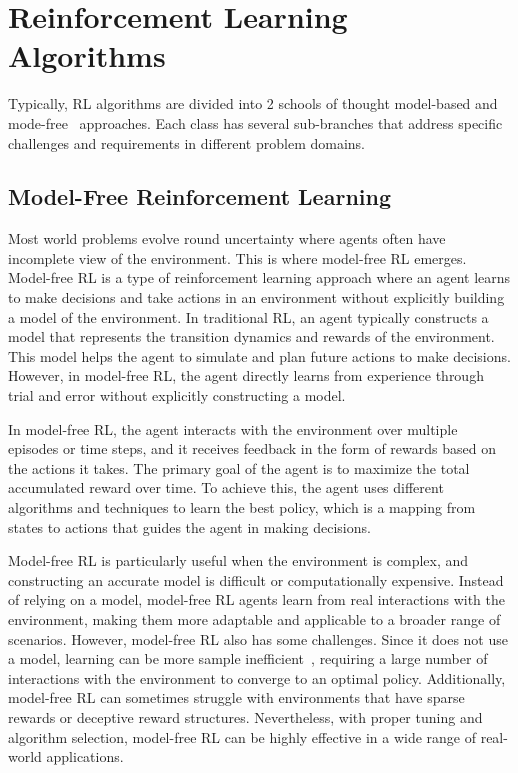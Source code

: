 \section{Reinforcement Learning Algorithms}\label{sec:reinforcement-learning-algorithms}

Typically, RL algorithms are divided into 2
schools of thought \textemdash model-based and mode-free~\cite{sutton2018reinforcement} approaches.
Each class has several sub-branches that address specific challenges and requirements in different problem domains.

\subsection{Model-Free Reinforcement Learning}\label{subsec:model-free-reinforcement-learning}
Most world problems evolve round uncertainty where agents often have incomplete view of the environment.
This is where model-free RL emerges.
Model-free RL is a type of reinforcement learning approach where an agent learns to make decisions and take actions in an environment without explicitly building a model of the environment. In traditional RL, an agent typically constructs a model that represents the transition dynamics and rewards of the environment. This model helps the agent to simulate and plan future actions to make decisions. However, in model-free RL, the agent directly learns from experience through trial and error without explicitly constructing a model.

In model-free RL, the agent interacts with the environment over multiple episodes or time steps, and it receives feedback in the form of rewards based on the actions it takes. The primary goal of the agent is to maximize the total accumulated reward over time. To achieve this, the agent uses different algorithms and techniques to learn the best policy, which is a mapping from states to actions that guides the agent in making decisions.

Model-free RL is particularly useful when the environment is complex, and constructing an accurate model is difficult or computationally expensive.
Instead of relying on a model, model-free RL agents learn from real interactions with the environment, making them more adaptable and applicable to a broader range of scenarios.
However, model-free RL also has some challenges.
Since it does not use a model, learning can be more sample inefficient~\cite{sutton2018reinforcement}, requiring a large number of interactions with the environment to converge to an optimal policy. Additionally, model-free RL can sometimes struggle with environments that have sparse rewards or deceptive reward structures. Nevertheless, with proper tuning and algorithm selection, model-free RL can be highly effective in a wide range of real-world applications.
